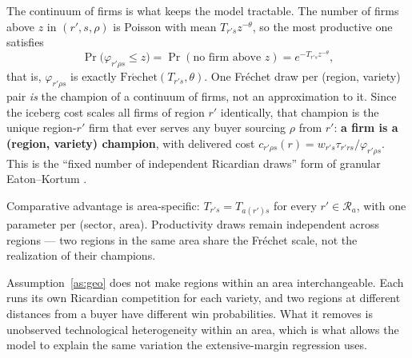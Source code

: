 The continuum of firms is what keeps the model tractable. The number of firms above $z$ in
$(r',s,\rho)$ is Poisson with mean $T_{r's}z^{-\theta}$, so the most productive one satisfies
\begin{equation}
\Pr\big(\varphi_{r'\rho s}\le z\big)=\Pr(\text{no firm above }z)=e^{-T_{r's}z^{-\theta}},
\label{eq:app-champion}
\end{equation}
that is, $\varphi_{r'\rho s}$ is exactly $\mathrm{Fr\acute{e}chet}(T_{r's},\theta)$. One
Fr\'echet draw per (region, variety) pair \emph{is} the champion of a continuum of firms, not an
approximation to it. Since the iceberg cost scales all firms of region $r'$ identically, that
champion is the unique region-$r'$ firm that ever serves any buyer sourcing $\rho$ from $r'$:
\textbf{a firm is a (region, variety) champion}, with delivered cost
$c_{r'\rho s}(r)=w_{r's}\tau_{r'rs}/\varphi_{r'\rho s}$. This is the ``fixed number of
independent Ricardian draws'' form of granular Eaton--Kortum \citep[cf.][]{eks2012,bejk2003}.

\begin{assumption}
\label{as:geo}
Comparative advantage is area-specific: $T_{r's}=T_{a(r')s}$ for every $r'\in\mathcal{R}_{a}$,
with one parameter per (sector, area). Productivity draws remain independent across regions ---
two regions in the same area share the Fr\'echet scale, not the realization of their champions.
\end{assumption}

Assumption~\ref{as:geo} does not make regions within an area interchangeable. Each runs its own
Ricardian competition for each variety, and two regions at different distances from a buyer have
different win probabilities. What it removes is unobserved technological heterogeneity within an
area, which is what allows the model to explain the same variation the extensive-margin
regression uses.

